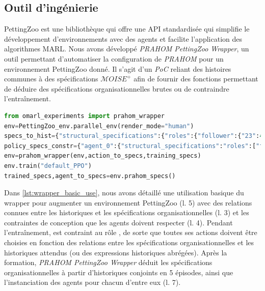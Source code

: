 \subsection{Outil d'ingénierie}

PettingZoo est une bibliothèque qui offre une API standardisée qui simplifie le développement d'environnements avec des agents et facilite l'application des algorithmes MARL.
Nous avons développé \emph{PRAHOM PettingZoo Wrapper}\label{PettingZoo-wrapper}, un outil permettant d'automatiser la configuration de \emph{PRAHOM} pour un environnement PettingZoo donné.
Il s'agit d'un \emph{PoC} reliant des histoires communes à des spécifications $\mathcal{M}OISE^+$ afin de fournir des fonctions permettant de déduire des spécifications organisationnelles brutes ou de contraindre l'entraînement. %
%
\begin{lstlisting}[language=Python, caption=PRAHOM PettingZoo Wrapper utilisation de base, label={lst:wrapper_basic_use}]
from omarl_experiments import prahom_wrapper
env=PettingZoo_env.parallel_env(render_mode="human")
specs_to_hist={"structural_specifications":{"roles":{"follower":{"23":41,"14":[74,0]}}...},"functional_specifications":{"links":{"(leader,follower,aut)":".*14.*?89"}...}...}
policy_specs_constr={"agent_0":{"structural_specifications":"roles":["follower"]}}
env=prahom_wrapper(env,action_to_specs,training_specs)
env.train("default_PPO")
trained_specs,agent_to_specs=env.prahom_specs()
\end{lstlisting}
%
Dans \autoref{lst:wrapper_basic_use}, nous avons détaillé une utilisation basique du wrapper pour augmenter un environnement PettingZoo (l. 5) avec des relations connues entre les historiques et les spécifications organisationnelles (l. 3) et les contraintes de conception que les agents doivent respecter (l. 4).
Pendant l'entraînement,  est contraint au rôle , de sorte que toutes ses actions doivent être choisies en fonction des relations entre les spécifications organisationnelles et les historiques attendus (ou des expressions historiques abrégées).
Après la formation, \emph{PRAHOM PettingZoo Wrapper} déduit les spécifications organisationnelles à partir d'historiques conjoints en 5 épisodes, ainsi que l'instanciation des agents pour chacun d'entre eux (l. 7).

